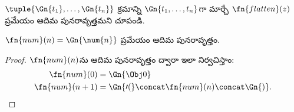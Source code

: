 \documentclass[../../../include/open-logic-section]{subfiles}
\begin{document}
\begin{prob}
$\tuple{\Gn{t_1},\dots,\Gn{t_n}}$ క్రమాన్ని $\Gn{t_1,\dots,t_n}$గా మార్చే
$\fn{flatten}(z)$ ప్రమేయం ఆదిమ పునరావృత్తమని చూపండి.
\end{prob}

\begin{prop}
  $\fn{num}(n)=\Gn{\num{n}}$ ప్రమేయం ఆదిమ పునరావృత్తం.
\end{prop}

\begin{proof}
  $\fn{num}(n)$ను ఆదిమ పునరావృత్తం ద్వారా ఇలా నిర్వచిస్తాం:
  \begin{align*}
    \fn{num}(0) & = \Gn{\Obj 0}\\
    \fn{num}(n+1) & = \Gn{\prime(} \concat \fn{num}(n) \concat \Gn{)}.
  \end{align*}
\end{proof}
\end{document}
